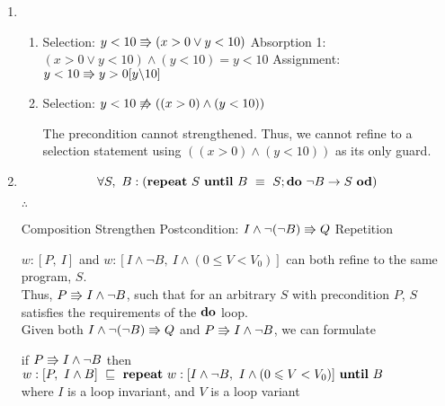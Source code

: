 \documentclass{article}
\begin{document}
\begin{enumerate}
\begin{enumerate}
    \end{enumerate}
\item
    \begin{enumerate}
    \item 
        \DERIVE
         {Selection: $y < 10 \Rrightarrow (x > 0 \lor y < 10)$}
         {Absorption 1: $(x > 0 \lor y < 10) \land (y < 10) = y < 10$}
         {Assignment: $y < 10 \Rrightarrow y > 0[y \backslash 10]$}
        \ENDDERIVE

    \item 
        \DERIVE
        \hint{\doesntrefsto} {Selection: $y < 10 \not\Rrightarrow ((x > 0) \land (y < 10))$}

        \ENDDERIVE

        The precondition cannot strengthened. Thus, we cannot refine to a selection statement using $((x > 0) \land (y < 10))$ as its only guard.
    \end{enumerate}
\item

    \[\forall S,\ B : (\Repeat\ S\ \Until\ B ~\equiv~ S; \Do\ \neg B \rightarrow S\ \Od)\]

    $\therefore$

    \DERIVE
     {Composition}
     {Strengthen Postcondition: $I \land \neg(\neg B) \Rrightarrow Q$}
     {Repetition}
    \ENDDERIVE

    $w: [P,\ I]$ and $w:[I \land \neg B,\ I \land (0 \leqslant V < V_0)]$ can both refine to the same program, $S$.\\

    Thus, $P \Rrightarrow I \land \neg B$, such that for an arbitrary $S$ with precondition $P$, $S$ satisfies the requirements of the ${\bf do}$ loop.\\

    Given both $I \land \neg(\neg B) \Rrightarrow Q$ and $P \Rrightarrow I \land \neg B$, we can formulate\\

    \begin{center}
    if $P \Rrightarrow I \land \neg B$ then $w:[P,\ I \land B] ~\refsto~ \Repeat\ w:[I \land \neg B,\ I \land (0 \leqslant V < V_0)]\ \Until\ B$\\
    where $I$ is a loop invariant, and $V$ is a loop variant
    \end{center}

\end{enumerate}
\end{document}
